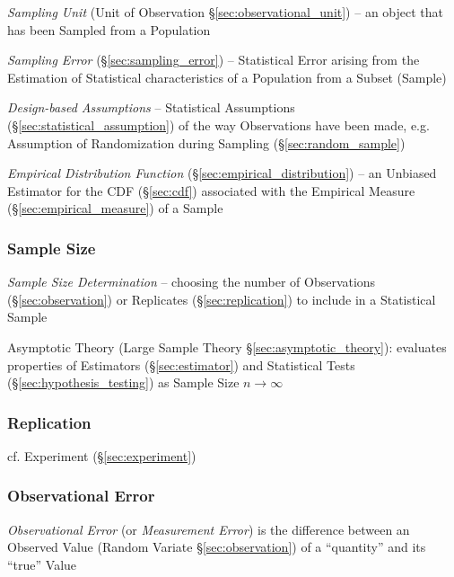 \fist \emph{Sampling Unit} (Unit of Observation \S\ref{sec:observational_unit})
-- an object that has been Sampled from a Population

\fist \emph{Sampling Error} (\S\ref{sec:sampling_error}) -- Statistical Error
arising from the Estimation of Statistical characteristics of a Population from
a Subset (Sample)

\fist \emph{Design-based Assumptions} -- Statistical Assumptions
(\S\ref{sec:statistical_assumption}) of the way Observations have been made,
e.g. Assumption of Randomization during Sampling (\S\ref{sec:random_sample})

\emph{Empirical Distribution Function} (\S\ref{sec:empirical_distribution}) --
an Unbiased Estimator for the CDF (\S\ref{sec:cdf}) associated with the
Empirical Measure (\S\ref{sec:empirical_measure}) of a Sample



\subsubsection{Sample Size}\label{sec:sample_size}

\emph{Sample Size Determination} -- choosing the number of Observations
(\S\ref{sec:observation}) or Replicates (\S\ref{sec:replication}) to include in
a Statistical Sample

\fist Asymptotic Theory (Large Sample Theory \S\ref{sec:asymptotic_theory}):
evaluates properties of Estimators (\S\ref{sec:estimator}) and Statistical Tests
(\S\ref{sec:hypothesis_testing}) as Sample Size $n \to \infty$



\subsubsection{Replication}\label{sec:sampling_replication}


cf. Experiment (\S\ref{sec:experiment})



\subsubsection{Observational Error}\label{sec:observational_error}

\emph{Observational Error} (or \emph{Measurement Error}) is the difference
between an Observed Value (Random Variate \S\ref{sec:observation}) of a
``quantity'' and its ``true'' Value

